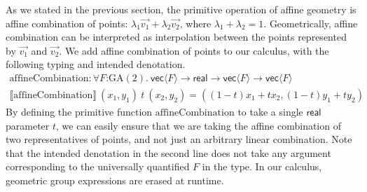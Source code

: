 \documentclass{article}
\newcommand{\GA}{\mathrm{GA}}
\newcommand{\sem}[1]{\llbracket #1 \rrbracket}
\begin{document}
As we stated in the previous section, the primitive operation of
affine geometry is affine combination of points: $\lambda_1\vec{v_1} +
\lambda_2\vec{v_2}$, where $\lambda_1 + \lambda_2 = 1$. Geometrically,
affine combination can be interpreted as interpolation between the
points represented by $\vec{v_1}$ and $\vec{v_2}$. We add affine
combination of points to our calculus, with the following typing and
intended denotation.
\begin{displaymath}
  \begin{array}{l}
    \mathrm{affineCombination} : \forall F \mathord: \GA(2).\ \mathsf{vec}\langle F \rangle \to \mathsf{real} \to \mathsf{vec}\langle F \rangle \to \mathsf{vec}\langle F \rangle \\
    \sem{\mathrm{affineCombination}}\ (x_1,y_1)\ t\ (x_2,y_2) = ((1-t)x_1 + tx_2, (1-t)y_1 + ty_2)
  \end{array}
\end{displaymath}
By defining the primitive function $\mathrm{affineCombination}$ to
take a single $\mathsf{real}$ parameter $t$, we can easily ensure that
we are taking the affine combination of two representatives of points,
and not just an arbitrary linear combination. Note that the intended
denotation in the second line does not take any argument corresponding
to the universally quantified $F$ in the type. In our calculus,
geometric group expressions are erased at runtime.

\end{document}
